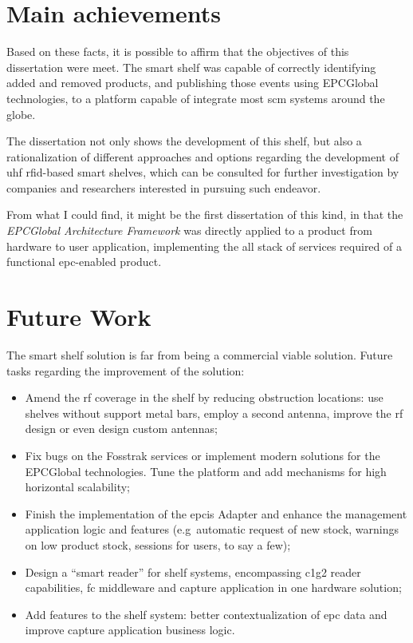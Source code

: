 \section{Main achievements}

Based on these facts, it is possible to affirm that the objectives of this dissertation were meet.
The smart shelf was capable of correctly identifying added and removed products, and publishing those events using EPCGlobal technologies, to a platform capable of integrate most \ac{scm} systems around the globe.

The dissertation not only shows the development of this shelf, but also a rationalization of different approaches and options regarding the development of \ac{uhf} \ac{rfid}-based smart shelves, which can be consulted for further investigation by companies and researchers interested in pursuing such endeavor.

From what I could find, it might be the first dissertation of this kind, in that the \emph{EPCGlobal Architecture Framework} was directly applied to a product from hardware to user application, implementing the all stack of services required of a functional \ac{epc}-enabled product.

\section{Future Work}

The smart shelf solution is far from being a commercial viable solution.
Future tasks regarding the improvement of the solution:

\begin{itemize}
    \item Amend the \ac{rf} coverage in the shelf by reducing obstruction locations: use shelves without support metal bars, employ a second antenna, improve the \ac{rf} design or even design custom antennas;
    \item Fix bugs on the Fosstrak services or implement modern solutions for the EPCGlobal technologies. Tune the platform and add mechanisms for high horizontal scalability;
    \item Finish the implementation of the \ac{epcis} Adapter and enhance the management application logic and features (e.g\ automatic request of new stock, warnings on low product stock, sessions for users, to say a few);
    \item Design a ``smart reader'' for shelf systems, encompassing \ac{c1g2} reader capabilities, \ac{fc} middleware and capture application in one hardware solution;
    \item Add features to the shelf system: better contextualization of \ac{epc} data and improve capture application business logic.
\end{itemize}